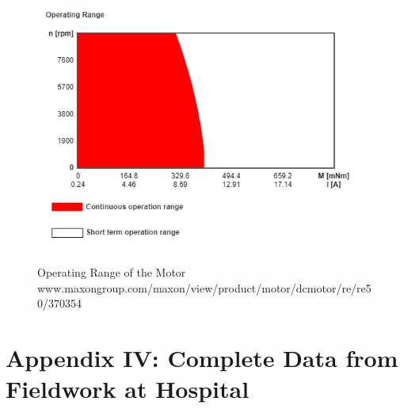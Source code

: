 \documentclass[12pt]{report}
\begin{document}
	\begin{figure}[h] 
		\centering
		\includegraphics[width=0.75\linewidth]{Motor_range}
		\caption{Operating Range of the Motor \newline \small www.maxongroup.com/maxon/view/product/motor/dcmotor/re/re50/370354}
		\label{fig:motor_range}
	\end{figure}

\chapter*{Appendix IV: Complete Data from Fieldwork at Hospital}
	


\end{document}
